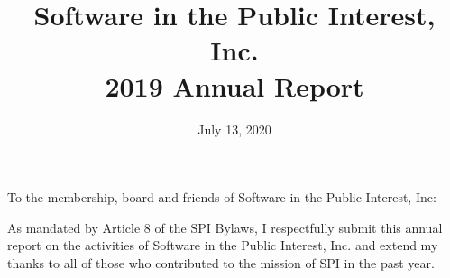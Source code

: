 \documentclass[a4paper]{report}
\begin{document}
\title{Software in the Public Interest, Inc.\\
2019 Annual Report}
\date{July 13, 2020}

\maketitle

\newpage


\hspace{1em}

To the membership, board and friends of Software in the Public Interest, Inc:

As mandated by Article 8 of the SPI Bylaws, I respectfully submit this annual
report on the activities of Software in the Public Interest, Inc. and extend my
thanks to all of those who contributed to the mission of SPI in the past year.
\end{document}
